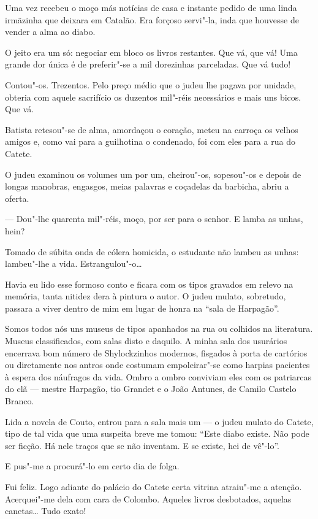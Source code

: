 Uma vez recebeu o moço más notícias de casa e instante pedido de uma
linda irmãzinha que deixara em Catalão. Era forçoso servi"-la, inda que
houvesse de vender a alma ao diabo.

O jeito era um só: negociar em bloco os livros restantes. Que vá, que
vá! Uma grande dor única é de preferir"-se a mil dorezinhas parceladas.
Que vá tudo!

Contou"-os. Trezentos. Pelo preço médio que o judeu lhe pagava por
unidade, obteria com aquele sacrifício os duzentos mil"-réis necessários
e mais uns bicos. Que vá.

Batista retesou"-se de alma, amordaçou o coração, meteu na carroça os
velhos amigos e, como vai para a guilhotina o condenado, foi com eles
para a rua do Catete.

O judeu examinou os volumes um por um, cheirou"-os, sopesou"-os e depois
de longas manobras, engasgos, meias palavras e coçadelas da barbicha,
abriu a oferta.

--- Dou"-lhe quarenta mil"-réis, moço, por ser para o senhor. E lamba as
unhas, hein?

Tomado de súbita onda de cólera homicida, o estudante não lambeu as
unhas: lambeu"-lhe a vida. Estrangulou"-o\ldots{}

Havia eu lido esse formoso conto e ficara com os tipos gravados em
relevo na memória, tanta nitidez dera à pintura o autor. O judeu mulato,
sobretudo, passara a viver dentro de mim em lugar de honra na ``sala de
Harpagão''.

Somos todos nós uns museus de tipos apanhados na rua ou colhidos na
literatura. Museus classificados, com salas disto e daquilo. A minha
sala dos usurários encerrava bom número de Shylockzinhos modernos,
fisgados à porta de cartórios ou diretamente nos antros onde costumam
empoleirar"-se como harpias pacientes à espera dos náufragos da vida.
Ombro a ombro conviviam eles com os patriarcas do clã --- mestre
Harpagão, tio Grandet e o João Antunes, de Camilo Castelo Branco.

Lida a novela de Couto, entrou para a sala mais um --- o judeu mulato do
Catete, tipo de tal vida que uma suspeita breve me tomou: ``Este diabo
existe. Não pode ser ficção. Há nele traços que se não inventam. E se
existe, hei de vê"-lo''.

E pus"-me a procurá"-lo em certo dia de folga.

Fui feliz. Logo adiante do palácio do Catete certa vitrina atraiu"-me a
atenção. Acerquei"-me dela com cara de Colombo. Aqueles livros
desbotados, aquelas canetas\ldots{} Tudo exato!

